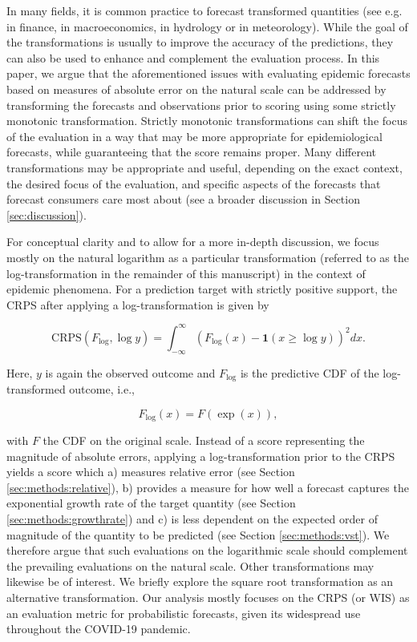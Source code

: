 \documentclass{article}
\begin{document}
In many fields, it is common practice to forecast transformed quantities (see e.g. \cite{taylorEvaluatingVolatilityInterval1999} in finance, \cite{mayrLogLevelVAR2015} in macroeconomics, \cite{loweStochasticRainfallrunoffForecasting2014} in hydrology or \cite{fuglstadDoesNonstationarySpatial2015} in meteorology). While the goal of the transformations is usually to improve the accuracy of the predictions, they can also be used to enhance and complement the evaluation process. 
In this paper, we argue that the aforementioned issues with evaluating epidemic forecasts based on measures of absolute error on the natural scale can be addressed by transforming the forecasts and observations prior to scoring using some strictly monotonic transformation. Strictly monotonic transformations can shift the focus of the evaluation in a way that may be more appropriate for epidemiological forecasts, while guaranteeing that the score remains proper. Many different transformations may be appropriate and useful, depending on the exact context, the desired focus of the evaluation, and specific aspects of the forecasts that forecast consumers care most about (see a broader discussion in Section \ref{sec:discussion}). 

For conceptual clarity and to allow for a more in-depth discussion, we focus mostly on the natural logarithm as a particular transformation (referred to as the log-transformation in the remainder of this manuscript) in the context of epidemic phenomena. For a prediction target with strictly positive support, the CRPS after applying a log-transformation is given by
%
\begin{linenomath*}
\begin{equation}
    \text{CRPS}(F_{\log}, \log y) = \int_{-\infty}^\infty \left( F_{\log}(x) - \boldsymbol{1}(x \geq \log y) \right)^2 dx.
\end{equation}    
\end{linenomath*}
%
Here, $y$ is again the observed outcome and $F_{\log}$ is the predictive CDF of the log-transformed outcome, i.e.,
\begin{linenomath*}
\begin{equation}
F_{\log}(x) = F(\exp(x)),
\end{equation}    
\end{linenomath*}
with $F$ the CDF on the original scale. Instead of a score representing the magnitude of absolute errors, applying a log-transformation prior to the CRPS yields a score which a) measures relative error (see Section \ref{sec:methods:relative}), b) provides a measure for how well a forecast captures the exponential growth rate of the target quantity (see Section \ref{sec:methods:growthrate}) and c) is less dependent on the expected order of magnitude of the quantity to be predicted (see Section \ref{sec:methods:vst}). 
We therefore argue that such evaluations on the logarithmic scale should complement the prevailing evaluations on the natural scale. 
Other transformations may likewise be of interest. We briefly explore the square root transformation as an alternative transformation. 
Our analysis mostly focuses on the CRPS (or WIS) as an evaluation metric for probabilistic forecasts, given its widespread use throughout the COVID-19 pandemic. 
\end{document}
